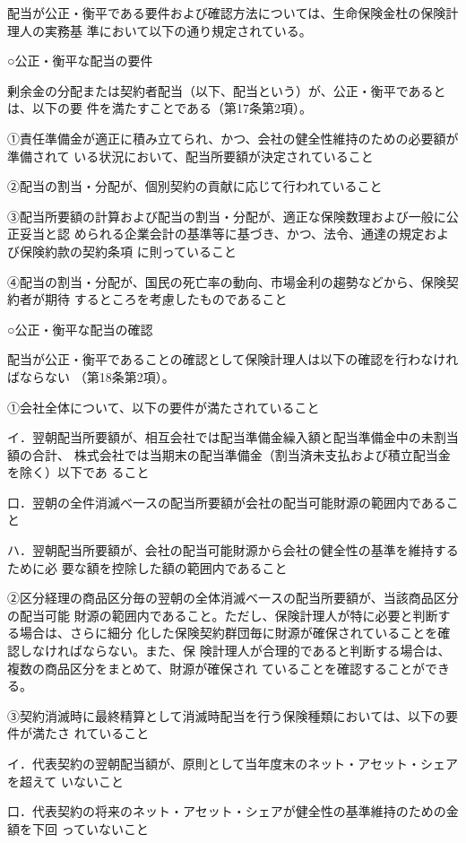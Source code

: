 \documentclass[report,gutter=10mm,fore-edge=10mm,uplatex,dvipdfmx]{jlreq}
\begin{document}
配当が公正・衡平である要件および確認方法については、生命保険金杜の保険計理人の実務基
準において以下の通り規定されている。

○公正・衡平な配当の要件

剰余金の分配または契約者配当（以下、配当という）が、公正・衡平であるとは、以下の要
件を満たすことである（第17条第2項）。

①責任準備金が適正に積み立てられ、かつ、会社の健全性維持のための必要額が準備されて
いる状況において、配当所要額が決定されていること

②配当の割当・分配が、個別契約の貢献に応じて行われていること

③配当所要額の計算および配当の割当・分配が、適正な保険数理および一般に公正妥当と認
められる企業会計の基準等に基づき、かつ、法令、通達の規定および保険約款の契約条項
に則っていること

④配当の割当・分配が、国民の死亡率の動向、市場金利の趨勢などから、保険契約者が期待
するところを考慮したものであること

○公正・衡平な配当の確認

配当が公正・衡平であることの確認として保険計理人は以下の確認を行わなければならない
（第18条第2項）。

①会社全体について、以下の要件が満たされていること

イ．翌朝配当所要額が、相互会社では配当準備金繰入額と配当準備金中の未割当額の合計、
株式会社では当期末の配当準備金（割当済未支払および積立配当金を除く）以下であ
ること

口．翌朝の全件消滅べ一スの配当所要額が会社の配当可能財源の範囲内であること

ハ．翌朝配当所要額が、会社の配当可能財源から会社の健全性の基準を維持するために必
要な額を控除した額の範囲内であること

②区分経理の商品区分毎の翌朝の全体消滅べ一スの配当所要額が、当該商品区分の配当可能
財源の範囲内であること。ただし、保険計理人が特に必要と判断する場合は、さらに細分
化した保険契約群団毎に財源が確保されていることを確認しなければならない。また、保
険計理人が合理的であると判断する場合は、複数の商品区分をまとめて、財源が確保され
ていることを確認することができる。

③契約消滅時に最終精算として消滅時配当を行う保険種類においては、以下の要件が満たさ
れていること

イ．代表契約の翌朝配当額が、原則として当年度末のネット・アセット・シェアを超えて
いないこと

口．代表契約の将来のネット・アセット・シェアが健全性の基準維持のための金額を下回
っていないこと
\end{document}
